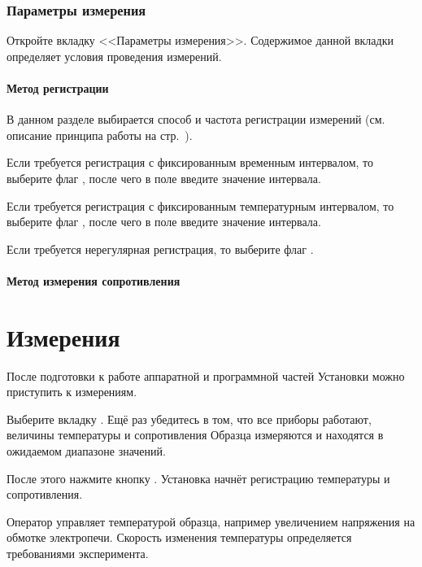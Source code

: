 \documentclass[12pt, a4paper, twocolumn]{report}
\begin{document}
\subsection{Параметры измерения}

Откройте вкладку <<Параметры измерения>>. Содержимое данной вкладки определяет условия проведения измерений.

\subsubsection{Метод регистрации}

В данном разделе выбирается способ и частота регистрации измерений (см. описание принципа работы на стр.~\pageref{sec_registration_types}).

Если требуется регистрация с фиксированным временным интервалом, то выберите флаг , после чего в поле  введите значение интервала.

Если требуется регистрация с фиксированным температурным интервалом, то выберите флаг , после чего в поле  введите значение интервала.

Если требуется нерегулярная регистрация, то выберите флаг .

\subsubsection{Метод измерения сопротивления}



\chapter{Измерения}

После подготовки к работе аппаратной и программной частей Установки можно приступить к измерениям.

Выберите вкладку . Ещё раз убедитесь в том, что все приборы работают, величины температуры и сопротивления Образца измеряются и находятся в ожидаемом диапазоне значений.

После этого нажмите кнопку . Установка начнёт регистрацию температуры и сопротивления.

Оператор управляет температурой образца, например увеличением напряжения на обмотке электропечи. Скорость изменения температуры определяется требованиями эксперимента.
\end{document}
